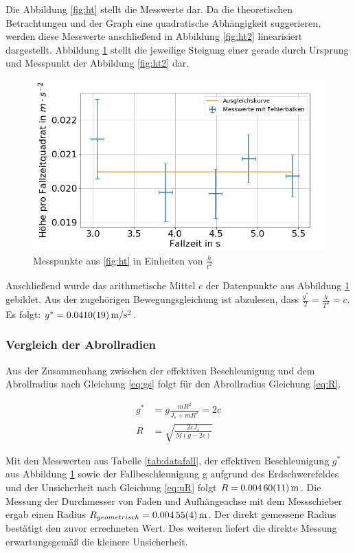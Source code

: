 Die Abbildung \ref{fig:ht} stellt die Messwerte dar. Da die theoretischen Betrachtungen und der Graph eine quadratische Abhängigkeit suggerieren, werden diese Messwerte anschließend in Abbildung \ref{fig:ht2} linearisiert dargestellt. Abbildung \ref{fig:tht-2} stellt die jeweilige Steigung einer gerade durch Ursprung und Messpunkt der Abbildung \ref{fig:ht2} dar. \\



\begin{figure}[h]
	\centering
	\includegraphics[width=0.7\linewidth]{auswertung/Fallrad/T,ht^-2}
	\caption{Messpunkte aus \cref{fig:ht} in Einheiten von $\frac{h}{t^2}$}
	\label{fig:tht-2}
\end{figure}




Anschließend wurde das arithmetische Mittel $c$ der Datenpunkte aus Abbildung \ref{fig:tht-2} gebildet. Aus der zugehörigen Bewegungsgleichung ist abzulesen, dass $\frac{g^*}{2}=\frac{h}{T^2}=c$. Es folgt: $g^*=\SI{0.0410 \pm  0.0019}{m \per s \squared}$.





\subsubsection{Vergleich der Abrollradien}


Aus der Zusammenhang zwischen der effektiven Beschleunigung und  dem Abrollradius nach Gleichung \ref{eq:gs} folgt für den Abrollradius Gleichung \ref{eq:R}.

\begin{align}
g^*  &= g \frac{mR^2}{J_s + m R^2}= 2c \label{eq:gs}\\
R&=\sqrt{\frac{2 c J_s}{M (g-2c)}} \label{eq:R}
\end{align}

Mit den Messwerten aus Tabelle \ref{tab:datafall}, der effektiven Beschleunigung $g^*$ aus Abbildung \ref{fig:tht-2} sowie der Fallbeschleunigung g aufgrund des Erdschwerefeldes und der Unsicherheit nach Gleichung \ref{eq:uR} folgt $R=\SI{0.00460\pm 0.00011}{m}$. Die Messung der Durchmesser von Faden und Aufhängeachse mit dem Messschieber ergab einen Radius $R_{geometrisch}=\SI{0.00455 \pm 0.00004}{m}$. Der direkt gemessene Radius bestätigt den zuvor errechneten Wert. Des weiteren liefert die direkte Messung erwartungsgemäß die kleinere Unsicherheit.  